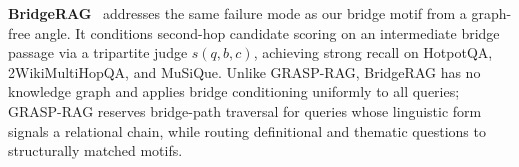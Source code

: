\textbf{BridgeRAG}~\cite{bacellar2026bridgerag} addresses the same failure
mode as our bridge motif from a graph-free angle.
It conditions second-hop candidate scoring on an intermediate bridge passage
via a tripartite judge $s(q, b, c)$, achieving strong recall on HotpotQA,
2WikiMultiHopQA, and MuSiQue.
Unlike GRASP-RAG, BridgeRAG has no knowledge graph and applies bridge
conditioning uniformly to all queries; GRASP-RAG reserves bridge-path
traversal for queries whose linguistic form signals a relational chain, while
routing definitional and thematic questions to structurally matched motifs.
